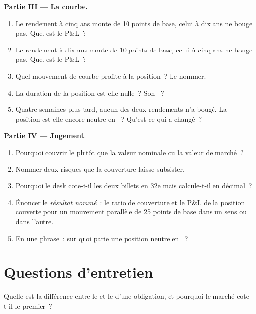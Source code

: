 \begin{problem}
\medskip\noindent\textbf{Partie III --- La courbe.}
\begin{enumerate}[resume]
\item Le rendement à cinq ans monte de 10 points de base, celui à dix ans ne bouge pas.
Quel est le P\&L~?
\item Le rendement à dix ans monte de 10 points de base, celui à cinq ans ne bouge pas.
Quel est le P\&L~?
\item Quel mouvement de courbe profite à la position~? Le nommer.
\item La duration de la position est-elle nulle~? Son ~?
\item Quatre semaines plus tard, aucun des deux rendements n'a bougé. La position est-elle encore
neutre en ~? Qu'est-ce qui a changé~?
\end{enumerate}

\medskip\noindent\textbf{Partie IV --- Jugement.}
\begin{enumerate}[resume]
\item Pourquoi couvrir le  plutôt que la valeur nominale ou la valeur de marché~?
\item Nommer deux risques que la couverture laisse subsister.
\item Pourquoi le desk cote-t-il les deux billets en 32e mais calcule-t-il en décimal~?
\item Énoncer le \emph{résultat nommé}~: le ratio de couverture et le P\&L de la
position couverte pour un mouvement parallèle de 25 points de base dans un sens ou dans l'autre.
\item En une phrase~: sur quoi parie une position neutre en ~?
\end{enumerate}
\end{problem}

\section{Questions d'entretien}

\begin{interviewq}\label{iq:m2:government-bonds:1}
Quelle est la différence entre le  et le  d'une
obligation, et pourquoi le marché cote-t-il le premier~?
\end{interviewq}

